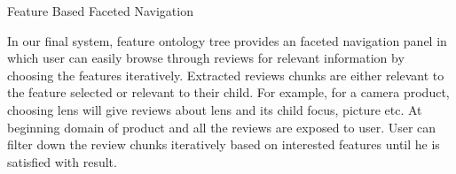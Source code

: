\begin{problem}
	Feature Based Faceted Navigation
\end{problem}

In our final system, feature ontology tree provides an faceted navigation panel in which user can easily browse through reviews for relevant information by choosing the features iteratively. Extracted reviews chunks are either relevant to the feature selected or relevant to their child. For example, for a camera product, choosing lens will give reviews about lens and its child focus, picture etc. At beginning domain of product and all the reviews are exposed to user. User can filter down the review chunks iteratively based on interested features until he is satisfied with result.   